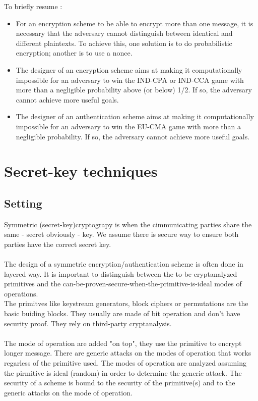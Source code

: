 \documentclass[11pt,a4paper]{report}
\begin{document}
To briefly resume : 
\begin{itemize}
\item For an encryption scheme to be able to encrypt more than one message, it is necessary that the adversary cannot distinguish between identical and different plaintexts. To achieve this, one solution is to do probabilistic encryption; another is to use a nonce.
\item The designer of an encryption scheme aims at making it computationally impossible for an adversary to win the IND-CPA or IND-CCA game with more than a negligible probability above (or below) 1/2. If so, the adversary cannot achieve more useful goals.
\item The designer of an authentication scheme aims at making it computationally impossible for an adversary to win the EU-CMA game with more than a negligible probability. If so, the adversary cannot achieve more useful goals.
\end{itemize}

\chapter{Secret-key techniques}
\section{Setting}
Symmetric (secret-key)cryptograpy is when the cimmunicating parties share the same - secret obviously - key. We assume there is secure way to ensure both parties have the correct secret key.\\ 
\\
The design of a symmetric encryption/authentication scheme is often done in layered way. It is important to distinguish between the to-be-cryptanalyzed primitives and the can-be-proven-secure-when-the-primitive-is-ideal modes of operations.\\
The primitves like keystream generators, block ciphers or permutations are the basic buiding blocks. They usually are made of bit operation and don't have security proof. They rely on third-party cryptanalysis.\\
\\
The mode of operation are added "on top", they use the primitive to encrypt longer message. There are generic attacks on the modes of operation that works regarless of the primitive used. The modes of operation are analyzed assuming the pirmitive is ideal (random) in order to determine the generic attack. 
The security of a scheme is bound to the security of the primitive(s) and to the generic attacks on the mode of operation.
\end{document}
